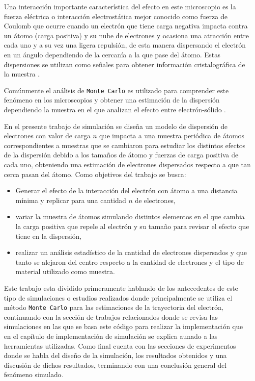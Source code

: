 \documentclass[3pt,twocolumn]{elsarticle}
\begin{document}
Una interacción importante característica del efecto en este microscopio es la fuerza eléctrica o interacción electrostática mejor conocido como fuerza de Coulomb que ocurre cuando un electrón que tiene carga negativa impacta contra un átomo (carga positiva) y su nube de electrones y ocasiona una atracción entre cada uno y a su vez una ligera repulsión, de esta manera dispersando el electrón en un ángulo dependiendo de la cercanía a la que pase del átomo. Estas dispersiones se utilizan como señales para obtener información cristalográfica de la muestra \cite{janecek2016modern}.

Comúnmente el análisis de \texttt{Monte Carlo} es utilizado para comprender este fenómeno en los microscopios y obtener una estimación de la dispersión dependiendo la muestra en el que analizan el efecto entre electrón-sólido \cite{new_MC}.

En el presente trabajo de simulación se diseña un modelo de dispersión de electrones con valor de carga $n$ que impacta a una muestra periódica de átomos correspondientes a muestras que se cambiaron para estudiar los distintos efectos de la dispersión debido a los tamaños de átomo y fuerzas de carga positiva de cada uno, obteniendo una estimación de electrones dispersados respecto a que tan cerca pasan del átomo. Como objetivos del trabajo se busca:
\begin{itemize}
    \item Generar el efecto de la interacción del electrón con átomo a una distancia mínima y replicar para una cantidad $n$ de electrones,
    \item variar la muestra de átomos simulando distintos elementos en el que cambia la carga positiva que repele al electrón y su tamaño para revisar el efecto que tiene en la dispersión,
    \item realizar un análisis estadístico de la cantidad de electrones dispersados y que tanto se alejaron del centro respecto a la cantidad de electrones y el tipo de material utilizado como muestra.
\end{itemize}
Este trabajo esta dividido primeramente hablando de los antecedentes de este tipo de simulaciones o estudios realizados donde principalmente se utiliza el método \texttt{Monte Carlo} para las estimaciones de la trayectoria del electrón, continuando con la sección de trabajos relacionados donde se revisa las simulaciones en las que se basa este código para realizar la implementación que en el capítulo de implementación de simulación se explica aunado a las herramientas utilizadas. Como final cuenta con las secciones de experimentos donde se habla del diseño de la simulación, los resultados obtenidos y una discusión de dichos resultados, terminando con una conclusión general del fenómeno simulado.
\end{document}
